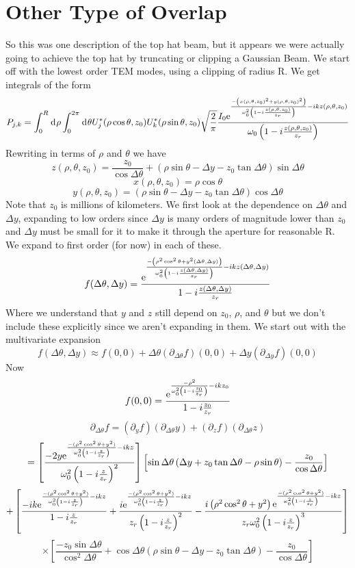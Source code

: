 \documentclass[11pt]{amsart}
\makeatletter
\newcommand{\e}{{\rm e}}				%
\newcommand{\msp}[1]{\mspace{#1mu}}		%
\newcommand{\0}{\varnothing}		%
\newcommand{\apr}{\approx}		%
\newcommand{\dd}{\msp{1} {\rm{d}} \msp{1}}	%
\newcommand{\pp}{\partial}					%
\newcommand{\1}{!}
\newcommand{\2}{@}
\newcommand{\3}{\#}
\newcommand{\4}{\$}
\newcommand{\5}{\%}
\newcommand{\6}{$^\wedge$}
\newcommand{\7}{\&}
\newcommand{\8}{*}
\newcommand{\9}{(}
\makeatother
\begin{document}
\section{Other Type of Overlap}
\noindent So this was one description of the top hat beam, but it appears we were actually going to achieve the top hat by truncating or clipping a Gaussian Beam. We start off with the lowest order TEM modes, using a clipping of radius R. We get integrals of the form
\[
P_{j,k} = \int_0^R \dd \rho \int_0^{2\pi} \dd \theta U^*_j(\rho \cos\theta,z_0)U^*_k(\rho \sin \theta,z_0)\sqrt{\frac{2}{\pi}}\frac{I_0\e^{\frac{-\left(x(\rho,\theta,z_0)^2 + y(\rho,\theta,z_0)^2\right)}{\omega_0^2\left(1-i\frac{z(\rho,\theta,z_0)}{z_r}\right)}-ikz(\rho,\theta,z_0)}}{\omega_0\left(1-i\frac{z(\rho,\theta,z_0)}{z_r}\right)}
\]
Rewriting in terms of $\rho$ and $\theta$ we have
\[
z(\rho,\theta,z_0) = \frac{z_0}{\cos \Delta \theta}+\left(\rho\sin\theta - \Delta y - z_0\tan \Delta \theta\right)\sin \Delta \theta
\]
\[
x(\rho,\theta,z_0) = \rho\cos \theta
\]
\[
y(\rho,\theta,z_0) = \left(\rho\sin\theta-\Delta y - z_0\tan \Delta \theta\right)\cos \Delta \theta
\]
Note that $z_0$ is millions of kilometers. We first look at the dependence on $\Delta \theta$ and $\Delta y$, expanding to low orders since $\Delta y$ is many orders of magnitude lower than $z_0$ and $\Delta y$ must be small for it to make it through the aperture for reasonable R. We expand to first order (for now) in each of these.
\[
f(\Delta \theta,\Delta y) = \frac{\e^{\frac{-\left(\rho^2\cos^2\theta +y^2(\Delta \theta, \Delta y)\right)}{\omega_0^2\left(1-i\frac{z(\Delta\theta,\Delta y)}{z_r}\right)}-ikz(\Delta \theta, \Delta y)}}{1-i\frac{z(\Delta \theta,\Delta y)}{z_r}}
\]
Where we understand that $y$ and $z$ still depend on $z_0$, $\rho$, and $\theta$ but we don't include these explicitly since we aren't expanding in them. We start out with the multivariate expansion \newpage
\[
f(\Delta \theta ,\Delta y) \apr f(0,0) + \Delta \theta\left(\pp_{\Delta \theta}f\right)(0,0) + \Delta y\left( \pp_{\Delta y} f\right)(0,0) 
\]
Now
\[
f(0,0) = \frac{\e^{\frac{-\rho^2}{\omega_0^2\left(1-i\frac{z_0}{z_r}\right)}-ikz_0}}{1-i\frac{z_0}{z_r}}
\]
\[
\pp_{\Delta \theta}f =(\pp_y f)(\pp_{\Delta \theta} y) + (\pp_z f)(\pp_{\Delta \theta} z)
\]
\[
= \left[\frac{-2y\e^{\frac{-(\rho^2\cos^2\theta+y^2)}{\omega_0^2\left(1-i\frac{z}{z_r}\right)}-ikz}}{\omega_0^2\left(1-i\frac{z}{z_r}\right)^2}\right]\left[\sin \Delta \theta\left(\Delta y + z_0\tan\Delta \theta - \rho \sin \theta\right) - \frac{z_0}{\cos \Delta \theta}\right]
\]
\[
+\left[\frac{-ik\e^{\frac{-(\rho^2\cos^2\theta+y^2)}{\omega_0^2\left(1-i\frac{z}{z_r}\right)}-ikz}}{1-i\frac{z}{z_r}}+\frac{i\e^{\frac{-(\rho^2\cos^2\theta+y^2)}{\omega_0^2\left(1-i\frac{z}{z_r}\right)}-ikz}}{z_r\left(1-i\frac{z}{z_r}\right)^2}-\frac{i\left(\rho^2\cos^2 \theta+y^2\right)\e^{\frac{-(\rho^2\cos^2\theta+y^2)}{\omega_0^2\left(1-i\frac{z}{z_r}\right)}-ikz}}{z_r\omega_0^2\left(1-i\frac{z}{z_r}\right)^3}\right]\]\[\times\left[\frac{-z_0\sin\Delta \theta}{\cos^2\Delta \theta} + \cos \Delta \theta \left(\rho \sin \theta - \Delta y - z_0\tan \Delta \theta\right) - \frac{z_0}{\cos \Delta \theta}\right]
\]
\end{document}
